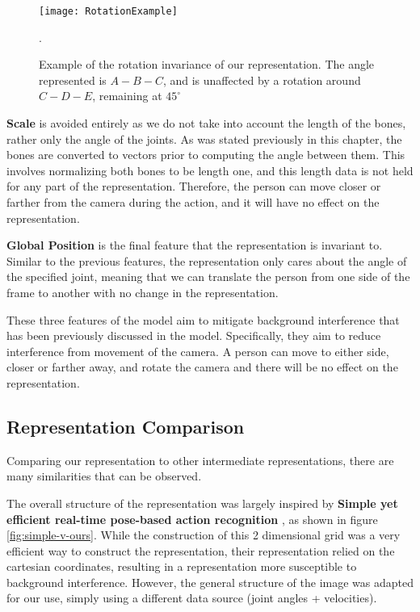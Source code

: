 \begin{figure}[ht]
	\texttt{[image: RotationExample]}
	\centering
	\caption{Example of the rotation invariance of our representation. The angle represented is $A-B-C$, and is unaffected by a rotation around $C-D-E$, remaining at $45^{\circ}$}.
	\label{fig:rotation-invariant}
\end{figure}

\textbf{Scale} is avoided entirely as we do not take into account the length of the bones, rather only the angle of the joints. As was stated previously in this chapter, the bones are converted to vectors prior to computing the angle between them. This involves normalizing both bones to be length one, and this length data is not held for any part of the representation. Therefore, the person can move closer or farther from the camera during the action, and it will have no effect on the representation.

\textbf{Global Position} is the final feature that the representation is invariant to. Similar to the previous features, the representation only cares about the angle of the specified joint, meaning that we can translate the person from one side of the frame to another with no change in the representation.

These three features of the model aim to mitigate background interference that has been previously discussed in the model. Specifically, they aim to reduce interference from movement of the camera. A person can move to either side, closer or farther away, and rotate the camera  and there will be no effect on the representation.

\subsection{Representation Comparison}

Comparing our representation to other intermediate representations, there are many similarities that can be observed.

The overall structure of the representation was largely inspired by \textbf{Simple yet efficient real-time pose-based action recognition} \cite{simple_yet_efficient}, as shown in figure \ref{fig:simple-v-ours}. While the construction of this 2 dimensional grid was a very efficient way to construct the representation, their representation relied on the cartesian coordinates, resulting in a representation more susceptible to background interference. However, the general structure of the image was adapted for our use, simply using a different data source (joint angles + velocities).


